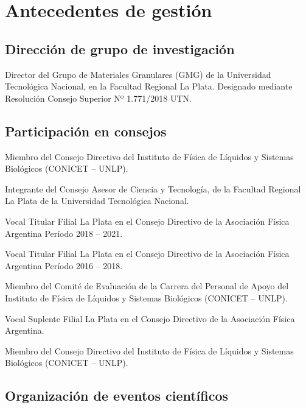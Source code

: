 \section{Antecedentes de gestión}

\subsection{Dirección de grupo de investigación}
 Director del Grupo de Materiales Granulares (GMG) de la Universidad Tecnológica Nacional, en la Facultad Regional La Plata. Designado mediante Resolución Consejo Superior Nº 1.771/2018 UTN.

\subsection{Participación en consejos }

 Miembro del Consejo Directivo del Instituto de Física de Líquidos y Sistemas Biológicos (CONICET -- UNLP).


  Integrante del Consejo Asesor de Ciencia y Tecnología, de la Facultad Regional La Plata de la Universidad Tecnológica Nacional.
 
  Vocal Titular Filial La Plata en el Consejo Directivo de la Asociación Física Argentina Período 2018 -- 2021.

   Vocal Titular Filial La Plata en el Consejo Directivo de la Asociación Física Argentina Período 2016 -- 2018.

   Miembro del Comité de Evaluación de la Carrera del Personal de Apoyo del Instituto de Física de Líquidos y Sistemas Biológicos (CONICET -- UNLP).
  
  
   Vocal Suplente Filial La Plata en el Consejo Directivo de la Asociación Física Argentina.
  
   Miembro del Consejo Directivo del Instituto de Física de Líquidos y Sistemas Biológicos (CONICET -- UNLP).
  

\subsection{Organización de eventos científicos}

